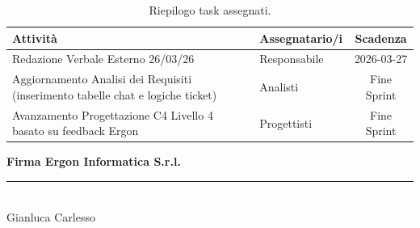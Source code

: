 \documentclass[a4paper, 11pt, oneside]{scrartcl} %
\begin{document}
\begin{table}[h!]
\centering
\begin{tabularx}{\textwidth}{@{}X l c@{}}
\toprule
\textbf{Attività} & \textbf{Assegnatario/i} & \textbf{Scadenza} \\
\midrule
Redazione Verbale Esterno 26/03/26 & Responsabile & 2026-03-27 \\
\addlinespace
Aggiornamento Analisi dei Requisiti (inserimento tabelle chat e logiche ticket) & Analisti & Fine Sprint \\
\addlinespace
Avanzamento Progettazione C4 Livello 4 basato su feedback Ergon & Progettisti & Fine Sprint \\
\bottomrule
\end{tabularx}
\caption{Riepilogo task assegnati.}
\end{table}

\vspace{2cm} 
\begin{flushright}
    \textbf{Firma Ergon Informatica S.r.l.} \\[0.5cm]

    
    \vspace{3cm}
    \rule{6cm}{0.4pt} \\
    \small{Gianluca Carlesso}
\end{flushright}
\end{document}
